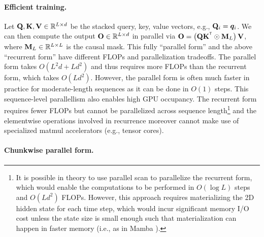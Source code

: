 \vspace{-1mm}

\paragraph{Efficient training.}  Let ${\mathbf{Q}}, {\mathbf{K}}, {\mathbf{V}} \in \mathbb{R}^{L \times d}$ be the stacked query, key, value vectors, e.g., ${\mathbf{Q}}_i = {\bm{q}}_i$. We can then compute the output ${\mathbf{O}} \in \mathbb{R}^{L \times d}$ in parallel via $\rmO = \left(\rmQ \rmK^\intercal \odot \rmM_L  \right ) \rmV$,  where ${\mathbf{M}}_L \in \mathbb{R}^{L \times L}$ is the causal mask. This fully ``parallel form'' and the above ``recurrent form'' have different FLOPs and parallelization tradeoffs. The parallel form takes $O(L^2d +Ld^2)$ and thus requires more FLOPs than the recurrent form, which takes $O(Ld^2)$. However, the parallel form is often much faster in practice for moderate-length sequences as it can be done in $O(1)$ steps. This sequence-level parallellism also enables high GPU occupancy. The recurrent form requires fewer FLOPs  but cannot be parallelized across sequence length\footnote{\label{footnote:1}It is possible in theory to use parallel scan \cite{Blelloch1990PrefixSA} to parallelize the recurrent form, which would enable the computations to be performed in $O(\log L)$ steps and $O(Ld^2)$ FLOPs. However, this approach requires materializing the 2D hidden state for each time step, which would incur significant memory I/O cost unless the state size is small enough such that materialization can happen in faster memory (i.e., as in Mamba \cite{gu_mamba_2023}).}  and the elementwise operations involved in  recurrence moreover cannot make use of specialized matmul accelerators (e.g., tensor cores).

\vspace{-1mm}

\paragraph{Chunkwise parallel form.} 


